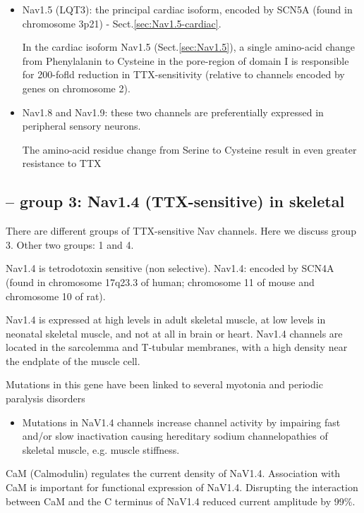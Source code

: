 \begin{itemize}
    \item Nav1.5 (LQT3): the principal cardiac isoform, encoded by SCN5A (found in
  chromosome 3p21) \citep{marban1998} - Sect.\ref{sec:Nav1.5-cardiac}.
   
   In the cardiac isoform Nav1.5 (Sect.\ref{sec:Nav1.5}), a
  single amino-acid change from Phenylalanin to Cysteine in the pore-region of
  domain I is responsible for 200-fofld reduction in TTX-sensitivity (relative
  to channels encoded by genes on chromosome 2).
  
   \item Nav1.8 and Nav1.9: these two channels are preferentially expressed in
   peripheral sensory neurons.
   
   The amino-acid residue change from Serine to Cysteine result in even greater
   resistance to TTX 
    
\end{itemize}  

\subsection{-- group 3: Nav1.4 (TTX-sensitive) in skeletal}
\label{sec:TTX-sensitive-Nav1-group-3}

There are different groups of TTX-sensitive Nav channels. Here we discuss group
3. Other two groups: 1 and 4. 

Nav1.4 is tetrodotoxin sensitive (non selective).
Nav1.4: encoded by SCN4A (found in chromosome 17q23.3 of human; chromosome 11 of
mouse and chromosome 10 of rat).

Nav1.4 is expressed at high levels in adult skeletal muscle, at low levels in
neonatal skeletal muscle, and not at all in brain or heart. Nav1.4 channels are
located in the sarcolemma and T-tubular membranes, with a high density near the
endplate of the muscle cell.

Mutations in this gene have been linked to several myotonia and periodic
paralysis disorders
\begin{itemize} 
  \item Mutations in NaV1.4 channels increase channel activity by impairing fast and/or
slow inactivation causing hereditary sodium channelopathies of skeletal muscle,
e.g. muscle stiffness.
  
\end{itemize}

CaM (Calmodulin) regulates the current density of NaV1.4. Association with CaM
is important for functional expression of NaV1.4. Disrupting the interaction
between CaM and the C terminus of NaV1.4 reduced current amplitude by 99\%.


